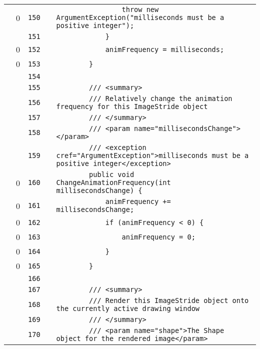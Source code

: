 \documentclass[a4paper,landscape,10pt]{article}
\begin{document}
\begin{longtable}[l]{lrrll}
\cellcolor{red} & 0 & \verb~150~ & & \verb~                throw new ArgumentException("milliseconds must be a positive integer");~\\
\cellcolor{gray} &  & \verb~151~ & & \verb~            }~\\
\cellcolor{red} & 0 & \verb~152~ & & \verb~            animFrequency = milliseconds;~\\
\cellcolor{red} & 0 & \verb~153~ & & \verb~        }~\\
\cellcolor{gray} &  & \verb~154~ & & \verb~~\\
\cellcolor{gray} &  & \verb~155~ & & \verb~        /// <summary>~\\
\cellcolor{gray} &  & \verb~156~ & & \verb~        /// Relatively change the animation frequency for this ImageStride object~\\
\cellcolor{gray} &  & \verb~157~ & & \verb~        /// </summary>~\\
\cellcolor{gray} &  & \verb~158~ & & \verb~        /// <param name="millisecondsChange"></param>~\\
\cellcolor{gray} &  & \verb~159~ & & \verb~        /// <exception cref="ArgumentException">milliseconds must be a positive integer</exception>~\\
\cellcolor{red} & 0 & \verb~160~ & & \verb~        public void ChangeAnimationFrequency(int millisecondsChange) {~\\
\cellcolor{red} & 0 & \verb~161~ & & \verb~            animFrequency += millisecondsChange;~\\
\cellcolor{red} & 0 & \verb~162~ & & \verb~            if (animFrequency < 0) {~\\
\cellcolor{red} & 0 & \verb~163~ & & \verb~                animFrequency = 0;~\\
\cellcolor{red} & 0 & \verb~164~ & & \verb~            }~\\
\cellcolor{red} & 0 & \verb~165~ & & \verb~        }~\\
\cellcolor{gray} &  & \verb~166~ & & \verb~~\\
\cellcolor{gray} &  & \verb~167~ & & \verb~        /// <summary>~\\
\cellcolor{gray} &  & \verb~168~ & & \verb~        /// Render this ImageStride object onto the currently active drawing window~\\
\cellcolor{gray} &  & \verb~169~ & & \verb~        /// </summary>~\\
\cellcolor{gray} &  & \verb~170~ & & \verb~        /// <param name="shape">The Shape object for the rendered image</param>~\\

\end{longtable}
\end{document}
